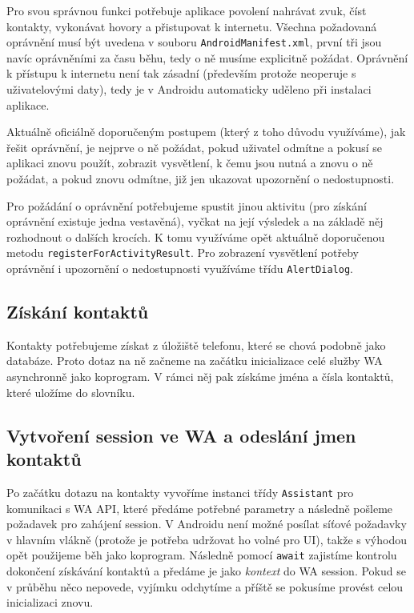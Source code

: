 Pro svou správnou funkci potřebuje aplikace povolení nahrávat zvuk, číst
kontakty, vykonávat hovory a přistupovat k internetu. Všechna požadovaná
oprávnění musí být uvedena v souboru \texttt{AndroidManifest.xml}, první
tři jsou navíc oprávněními za času běhu, tedy o ně musíme explicitně
požádat. Oprávnění k přístupu k internetu není tak zásadní (především
protože neoperuje s uživatelovými daty), tedy je v Androidu automaticky
uděleno při instalaci aplikace.

Aktuálně oficiálně doporučeným postupem (který z toho důvodu využíváme), jak
řešit oprávnění, je nejprve o ně požádat, pokud uživatel odmítne a pokusí se
aplikaci znovu použít, zobrazit vysvětlení, k čemu jsou nutná a znovu o ně
požádat, a pokud znovu odmítne, již jen ukazovat upozornění o nedostupnosti.

Pro požádání o oprávnění potřebujeme spustit jinou aktivitu (pro získání
oprávnění existuje jedna vestavěná), vyčkat na její výsledek a na základě
něj rozhodnout o dalších krocích. K tomu využíváme opět aktuálně doporučenou
metodu \texttt{registerForActivityResult}. Pro zobrazení vysvětlení potřeby
oprávnění i upozornění o nedostupnosti využíváme třídu \texttt{AlertDialog}.

\subsection{Získání kontaktů}

Kontakty potřebujeme získat z úložiště telefonu, které se chová podobně jako
databáze. Proto dotaz na ně začneme na začátku inicializace celé služby WA
asynchronně jako koprogram. V rámci něj pak získáme jména a čísla kontaktů,
které uložíme do slovníku.

\subsection{Vytvoření session ve WA a odeslání jmen kontaktů}

Po začátku dotazu na kontakty vyvoříme instanci třídy \texttt{Assistant}
pro komunikaci s WA API, které předáme potřebné parametry a následně pošleme
požadavek pro zahájení session. V Androidu není možné posílat síťové požadavky
v hlavním vlákně (protože je potřeba udržovat ho volné pro UI), takže s výhodou
opět použijeme běh jako koprogram. Následně pomocí \texttt{await} zajistíme
kontrolu dokončení získávání kontaktů a předáme je jako \textit{kontext} do
WA session. Pokud se v průběhu něco nepovede, vyjímku odchytíme a příště
se pokusíme provést celou inicializaci znovu.

